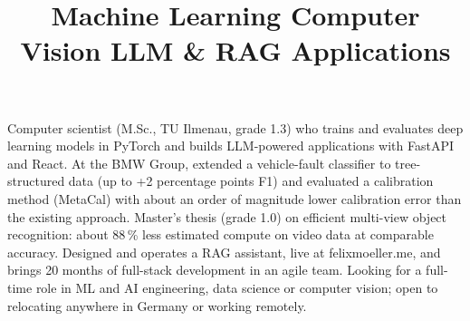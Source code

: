 \documentclass[11pt,a4paper,sans]{moderncv}
\title{Machine Learning \textbullet{} Computer Vision \textbullet{} LLM \& RAG Applications}
\begin{document}
\makecvtitle


\vspace{6pt}
\small{Computer scientist (M.Sc., TU Ilmenau, grade 1.3) who trains and evaluates deep learning models in PyTorch and builds LLM-powered applications with FastAPI and React. At the BMW Group, extended a vehicle-fault classifier to tree-structured data (up to +2 percentage points F1) and evaluated a calibration method (MetaCal) with about an order of magnitude lower calibration error than the existing approach. Master's thesis (grade 1.0) on efficient multi-view object recognition: about 88\,\% less estimated compute on video data at comparable accuracy. Designed and operates a RAG assistant, live at felixmoeller.me, and brings 20 months of full-stack development in an agile team. Looking for a full-time role in ML and AI engineering, data science or computer vision; open to relocating anywhere in Germany or working remotely.}

\end{document}
